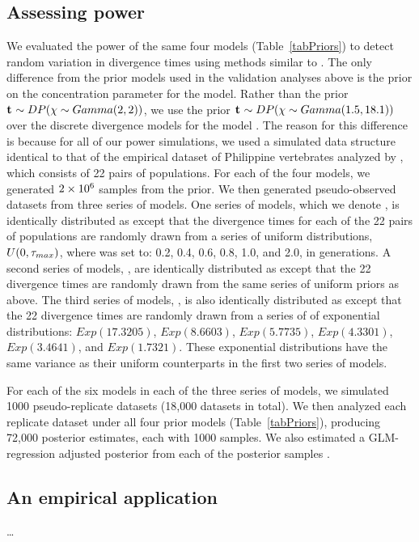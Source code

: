 \subsection*{Assessing power}
We evaluated the power of the same four models (Table~\ref{tabPriors}) to
detect random variation in divergence times using methods similar to
\citet{Oaks2012}.
The only difference from the prior models used in the validation analyses above
is the prior on the concentration parameter \concentrationParam for the
\modelDPP model.
Rather than the prior
$\mathbf{t_{}} \sim DP(\chi \sim Gamma(2,2))$,
we use the prior
$\mathbf{t_{}} \sim DP(\chi \sim Gamma(1.5,18.1))$
over the discrete divergence models for the model \modelDPP.
The reason for this difference is because for all of our power simulations, we
used a simulated data structure identical to that of the empirical dataset of
Philippine vertebrates analyzed by \citet{Oaks2012}, which consists of 22 pairs
of populations.
For each of the four models, we generated $2\times 10^{6}$ samples from the prior.
We then generated pseudo-observed datasets from three series of models.
One series of models, which we denote \powerSeriesOld, is identically
distributed as \modelOld except that the divergence times for each of the 22
pairs of populations are randomly drawn from a series of uniform distributions,
$U(0, \tau_{max})$, where  was set to: 0.2, 0.4, 0.6, 0.8, 1.0, and
2.0, in \globalcoalunit generations.
A second series of models, \powerSeriesUniform, are identically distributed as
\modelUniform except that the 22 divergence times are randomly drawn from the
same series of uniform priors as above.
The third series of models, \powerSeriesExp, is also identically
distributed as \modelUniform except that the 22 divergence times are randomly
drawn from a series of of exponential distributions: $Exp(17.3205)$,
$Exp(8.6603)$, $Exp(5.7735)$, $Exp(4.3301)$, $Exp(3.4641)$, and $Exp(1.7321)$.
These exponential distributions have the same variance as their uniform
counterparts in the first two series of models.

For each of the six models in each of the three series of models, we simulated
1000 pseudo-replicate datasets (18,000 datasets in total).
We then analyzed each replicate dataset under all four prior models
(Table~\ref{tabPriors}), producing 72,000 posterior estimates, each with 1000
samples.
We also estimated a GLM-regression adjusted posterior from each of the
posterior samples \citep{Leuenberger2010}.

\subsection*{An empirical application}
\ldots

